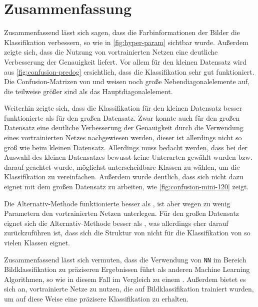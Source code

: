 \section{Zusammenfassung}
Zusammenfassend lässt sich sagen, dass die Farbinformationen der Bilder die
Klassifikation verbessern, so wie in \autoref{fig:hyper-param} sichtbar wurde.
Außerdem zeigte sich, dass die Nutzung von vortrainierten Netzen eine deutliche
Verbesserung der Genauigkeit liefert. Vor allem für den kleinen Datensatz wird
aus \autoref{fig:confusion-predog} ersichtlich, dass die Klassifikation sehr gut
funktioniert. Die Confusion-Matrizen von \MiniDog{} und \RF{} weisen noch große
Nebendiagonalelemente auf, die teilweise größer sind als das
Hauptdiagonalelement.

Weiterhin zeigte sich, dass die Klassifikation für den kleinen Datensatz besser
funktionierte als für den großen Datensatz. Zwar konnte auch für den großen
Datensatz eine deutliche Verbesserung der Genauigkeit durch die Verwendung eines
vortrainierten Netzes nachgewiesen werden, dieser ist allerdings nicht so groß
wie beim kleinen Datensatz. Allerdings muss bedacht werden, dass bei der Auswahl
des kleinen Datensatzes bewusst keine Unterarten gewählt wurden bzw. darauf
geachtet wurde, möglichst unterscheidbare Klassen zu wählen, um die
Klassifikation zu vereinfachen. Außerdem wurde deutlich, dass sich \MiniDog{}
nicht dazu eignet mit dem großen Datensatz zu arbeiten, wie
\autoref{fig:confusion-mini-120} zeigt.

Die Alternativ-Methode funktionierte besser als \MiniDog{}, ist aber wegen zu
wenig Parametern den vortrainierten Netzen unterlegen. Für den großen Datensatz
eignet sich die Alternativ-Methode besser als \MiniDog{}, was allerdings eher
darauf zurückzuführen ist, dass sich die Struktur von \MiniDog{} nicht für die
Klassifikation von so vielen Klassen eignet.

Zusammenfassend lässt sich vermuten, dass die Verwendung von \texttt{NN} im
Bereich Bildklassifikation zu präziseren Ergebnissen führt als anderen Machine Learning
Algorithmen, so wie in diesem Fall im Vergleich zu einem \RF{}. Außerdem bietet es sich an,
vortrainierte Netze zu nutzen, die auf Bildklassifikation trainiert
wurden, um auf diese Weise eine präzisere Klassifikation zu erhalten.
